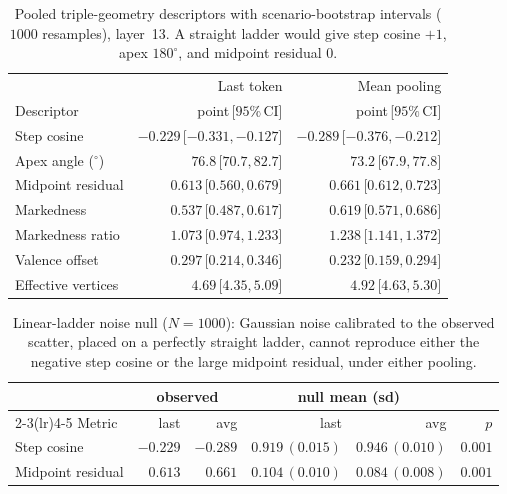\documentclass{article}
\begin{document}
\begin{table}[t]
\centering
\small
\begin{tabular}{lrr}
\toprule
 & Last token & Mean pooling \\
Descriptor & point\,[$95\%$\,CI] & point\,[$95\%$\,CI] \\
\midrule
Step cosine          & $-0.229$\,[$-0.331,-0.127$] & $-0.289$\,[$-0.376,-0.212$] \\
Apex angle ($^\circ$) & $76.8$\,[$70.7,82.7$] & $73.2$\,[$67.9,77.8$] \\
Midpoint residual    & $0.613$\,[$0.560,0.679$] & $0.661$\,[$0.612,0.723$] \\
Markedness           & $0.537$\,[$0.487,0.617$] & $0.619$\,[$0.571,0.686$] \\
Markedness ratio     & $1.073$\,[$0.974,1.233$] & $1.238$\,[$1.141,1.372$] \\
Valence offset       & $0.297$\,[$0.214,0.346$] & $0.232$\,[$0.159,0.294$] \\
Effective vertices   & $4.69$\,[$4.35,5.09$] & $4.92$\,[$4.63,5.30$] \\
\bottomrule
\end{tabular}
\caption{Pooled triple-geometry descriptors with scenario-bootstrap intervals
($1000$ resamples), layer~13. A straight ladder would give step cosine $+1$,
apex $180^\circ$, and midpoint residual $0$.}
\label{tab:geom-both}
\end{table}

\begin{table}[t]
\centering
\small
\begin{tabular}{lrrrrr}
\toprule
 & \multicolumn{2}{c}{observed} & \multicolumn{2}{c}{null mean (sd)} & \\
\cmidrule(lr){2-3}\cmidrule(lr){4-5}
Metric & last & avg & last & avg & $p$ \\
\midrule
Step cosine       & $-0.229$ & $-0.289$ & $0.919\,(0.015)$ & $0.946\,(0.010)$ & $0.001$ \\
Midpoint residual & $0.613$  & $0.661$  & $0.104\,(0.010)$ & $0.084\,(0.008)$ & $0.001$ \\
\bottomrule
\end{tabular}
\caption{Linear-ladder noise null ($N=1000$): Gaussian noise calibrated to the
observed scatter, placed on a perfectly straight ladder, cannot reproduce either
the negative step cosine or the large midpoint residual, under either pooling.}
\label{tab:noise-both}
\end{table}
\end{document}

